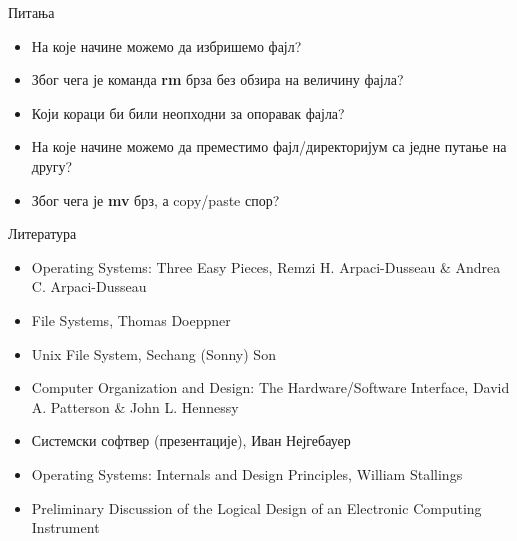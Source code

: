 \documentclass[xcolor=table]{beamer}
\begin{document}
    \begin{frame}{Питања}
        \begin{itemize}
            \item На које начине можемо да избришемо фајл?
            \item Због чега је команда \textbf{rm} брза без обзира на величину фајла?
            \item Који кораци би били неопходни за опоравак фајла?
            \item На које начине можемо да преместимо фајл/директоријум са једне путање на другу?
            \item Због чега је \textbf{mv} брз, а copy/paste спор?
        \end{itemize}
    \end{frame}
    
    \begin{frame}{Литература}
        \begin{itemize}
            \item Operating Systems: Three Easy Pieces, Remzi H. Arpaci-Dusseau \& Andrea C. Arpaci-Dusseau
            \item File Systems, Thomas Doeppner
            \item Unix File System, Sechang (Sonny) Son
            \item Computer Organization and Design: The Hardware/Software Interface, David A. Patterson \& John L. Hennessy
            \item Системски софтвер (презентације), Иван Нејгебауер
            \item Operating Systems: Internals and Design Principles, William Stallings
            \item Preliminary Discussion of the Logical Design of an Electronic Computing Instrument
        \end{itemize}
    \end{frame}
\end{document}
